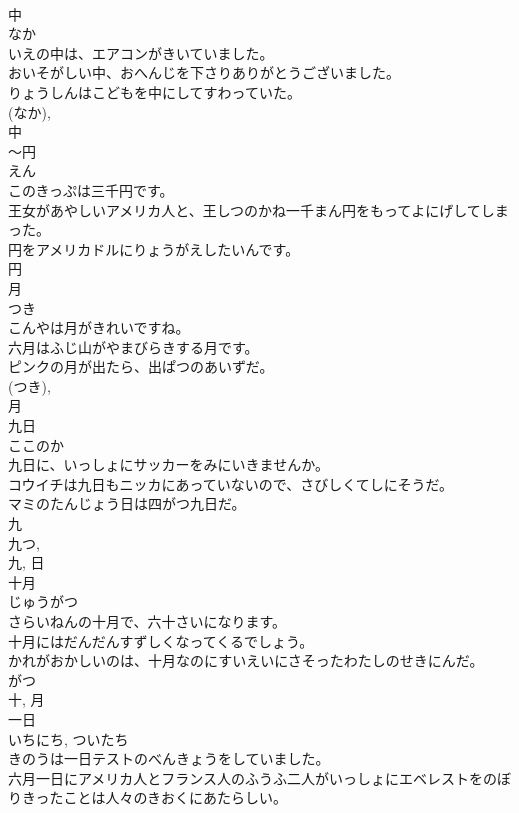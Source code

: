 \documentclass[8pt]{extreport}
\begin{document}
\begin{CJK}{UTF8}{min}
\\	中	
\\	なか	
\\	いえの中は、エアコンがきいていました。	
\\	おいそがしい中、おへんじを下さりありがとうございました。	
\\	りょうしんはこどもを中にしてすわっていた。	
\\	(なか), 
\\	中	
\\	〜円	
\\	えん	
\\	このきっぷは三千円です。	
\\	王女があやしいアメリカ人と、王しつのかね一千まん円をもってよにげしてしまった。	
\\	円をアメリカドルにりょうがえしたいんです。	
\\	円	
\\	月	
\\	つき	
\\	こんやは月がきれいですね。	
\\	六月はふじ山がやまびらきする月です。	
\\	ピンクの月が出たら、出ぱつのあいずだ。	
\\	(つき), 
\\	月	
\\	九日	
\\	ここのか	
\\	九日に、いっしょにサッカーをみにいきませんか。	
\\	コウイチは九日もニッカにあっていないので、さびしくてしにそうだ。	
\\	マミのたんじょう日は四がつ九日だ。	
\\	九 
\\	九つ, 
\\	九, 日	
\\	十月	
\\	じゅうがつ	
\\	さらいねんの十月で、六十さいになります。	
\\	十月にはだんだんすずしくなってくるでしょう。	
\\	かれがおかしいのは、十月なのにすいえいにさそったわたしのせきにんだ。	
\\	がつ 
\\	十, 月	
\\	一日	
\\	いちにち, ついたち	
\\	きのうは一日テストのべんきょうをしていました。	
\\	六月一日にアメリカ人とフランス人のふうふ二人がいっしょにエベレストをのぼりきったことは人々のきおくにあたらしい。	

\end{CJK}
\end{document}
